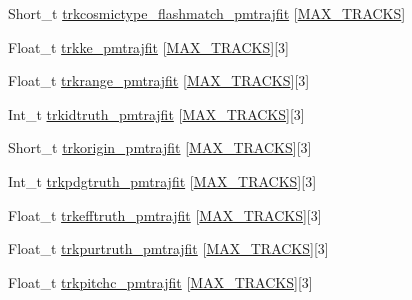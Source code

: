 \begin{DoxyCompactItemize}
\item 
Short\-\_\-t \hyperlink{classanatree_a89eb9920378b0313fbf2d039b42775f9}{trkcosmictype\-\_\-flashmatch\-\_\-pmtrajfit} \mbox{[}\hyperlink{anatree__core__v09410002_8h_a327fd4e796e4a0d78947524c96e4362e}{M\-A\-X\-\_\-\-T\-R\-A\-C\-K\-S}\mbox{]}
\item 
Float\-\_\-t \hyperlink{classanatree_a94f1ca3c3ca4622536802ffc7384bf37}{trkke\-\_\-pmtrajfit} \mbox{[}\hyperlink{anatree__core__v09410002_8h_a327fd4e796e4a0d78947524c96e4362e}{M\-A\-X\-\_\-\-T\-R\-A\-C\-K\-S}\mbox{]}\mbox{[}3\mbox{]}
\item 
Float\-\_\-t \hyperlink{classanatree_afab9c71811a62f2f898df45a87ed3ecd}{trkrange\-\_\-pmtrajfit} \mbox{[}\hyperlink{anatree__core__v09410002_8h_a327fd4e796e4a0d78947524c96e4362e}{M\-A\-X\-\_\-\-T\-R\-A\-C\-K\-S}\mbox{]}\mbox{[}3\mbox{]}
\item 
Int\-\_\-t \hyperlink{classanatree_a15ca95c148917641a77bb2a425aa1fcd}{trkidtruth\-\_\-pmtrajfit} \mbox{[}\hyperlink{anatree__core__v09410002_8h_a327fd4e796e4a0d78947524c96e4362e}{M\-A\-X\-\_\-\-T\-R\-A\-C\-K\-S}\mbox{]}\mbox{[}3\mbox{]}
\item 
Short\-\_\-t \hyperlink{classanatree_a9cfd1951a32ba252337ce500104ae6cc}{trkorigin\-\_\-pmtrajfit} \mbox{[}\hyperlink{anatree__core__v09410002_8h_a327fd4e796e4a0d78947524c96e4362e}{M\-A\-X\-\_\-\-T\-R\-A\-C\-K\-S}\mbox{]}\mbox{[}3\mbox{]}
\item 
Int\-\_\-t \hyperlink{classanatree_a612ea721fc3c57404dd6b15a4b0b6f76}{trkpdgtruth\-\_\-pmtrajfit} \mbox{[}\hyperlink{anatree__core__v09410002_8h_a327fd4e796e4a0d78947524c96e4362e}{M\-A\-X\-\_\-\-T\-R\-A\-C\-K\-S}\mbox{]}\mbox{[}3\mbox{]}
\item 
Float\-\_\-t \hyperlink{classanatree_a43587625e0267ff4e395f1856996abd5}{trkefftruth\-\_\-pmtrajfit} \mbox{[}\hyperlink{anatree__core__v09410002_8h_a327fd4e796e4a0d78947524c96e4362e}{M\-A\-X\-\_\-\-T\-R\-A\-C\-K\-S}\mbox{]}\mbox{[}3\mbox{]}
\item 
Float\-\_\-t \hyperlink{classanatree_acfc40e8430e7b9cdd1f23e44029897c9}{trkpurtruth\-\_\-pmtrajfit} \mbox{[}\hyperlink{anatree__core__v09410002_8h_a327fd4e796e4a0d78947524c96e4362e}{M\-A\-X\-\_\-\-T\-R\-A\-C\-K\-S}\mbox{]}\mbox{[}3\mbox{]}
\item 
Float\-\_\-t \hyperlink{classanatree_a72abc2ae37be9e5f08f59588515e4453}{trkpitchc\-\_\-pmtrajfit} \mbox{[}\hyperlink{anatree__core__v09410002_8h_a327fd4e796e4a0d78947524c96e4362e}{M\-A\-X\-\_\-\-T\-R\-A\-C\-K\-S}\mbox{]}\mbox{[}3\mbox{]}
\item 

\end{DoxyCompactItemize}

